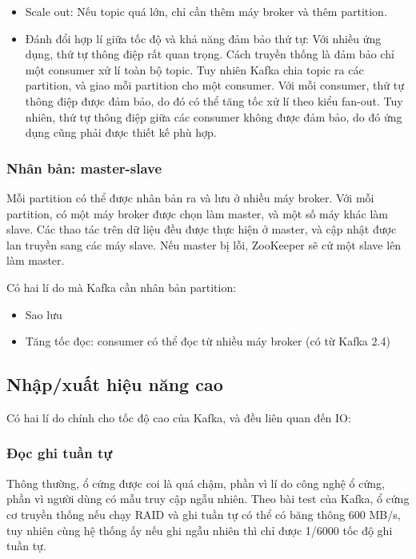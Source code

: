 \documentclass{article}
\begin{document}
\begin{itemize}
    \item Scale out: Nếu topic quá lớn, chỉ cần thêm máy broker và thêm
        partition.
    \item Đánh đổi hợp lí giữa tốc độ và khả năng đảm bảo thứ tự: Với nhiều ứng
        dụng, thứ tự thông điệp rất quan trọng. Cách truyền thống là đảm bảo chỉ
        một consumer xử lí toàn bộ topic. Tuy nhiên Kafka chia topic ra các
        partition, và giao mỗi partition cho một consumer. Với mỗi consumer, thứ
        tự thông điệp được đảm bảo, do đó có thể tăng tốc xử lí theo kiểu
        fan-out. Tuy nhiên, thứ tự thông điệp giữa các consumer không được đảm
        bảo, do đó ứng dụng cũng phải được thiết kế phù hợp.
\end{itemize}

\subsubsection{Nhân bản: master-slave}

Mỗi partition có thể được nhân bản ra và lưu ở nhiều máy broker. Với mỗi
partition, có một máy broker được chọn làm master, và một số máy khác làm slave.
Các thao tác trên dữ liệu đều được thực hiện ở master, và cập nhật được lan
truyền sang các máy slave. Nếu master bị lỗi, ZooKeeper sẽ cử một slave lên làm
master.

Có hai lí do mà Kafka cần nhân bản partition:

\begin{itemize}
    \item Sao lưu
    \item Tăng tốc đọc: consumer có thể đọc từ nhiều máy broker (có từ Kafka
        2.4)
\end{itemize}

\subsection{Nhập/xuất hiệu năng cao}

Có hai lí do chính cho tốc độ cao của Kafka, và đều liên quan đến IO\@:

\subsubsection{Đọc ghi tuần tự}

Thông thường, ổ cứng được coi là quá chậm, phần vì lí do công nghệ ổ cứng, phần
vì người dùng có mẫu truy cập ngẫu nhiên. Theo bài test của Kafka, ổ cứng cơ
truyền thống nếu chạy RAID và ghi tuần tự có thể có băng thông 600 MB/s, tuy
nhiên cùng hệ thống ấy nếu ghi ngẫu nhiên thì chỉ được 1/6000 tốc độ ghi tuần
tự.
\end{document}
